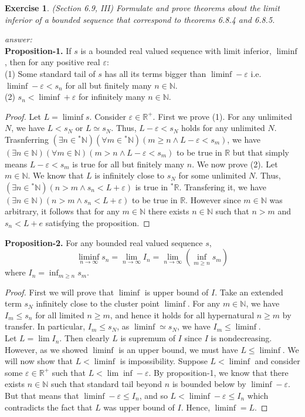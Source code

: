 \documentclass[a4paper, 11pt, openany]{book}
\theoremstyle{plain}
\newtheorem{exercise}{Exercise}[chapter]
\newenvironment{answer}
    {\textit{answer:}}
    {}
\theoremstyle{plain}
\newcommand{\arr}{\rightarrow}
\newcommand{\N}{\mathbb{N}}
\newcommand{\R}{\mathbb{R}}
\newcommand{\ep}{\varepsilon}
\newcommand{\hyp}{{}^*}
\begin{document}
  \begin{exercise}
    (Section 6.9, III)
    Formulate and prove theorems about the limit inferior of a bounded sequence that correspond to theorems 6.8.4 and 6.8.5.
  \end{exercise} 
  \begin{answer} $ $ \\
    \textbf{Proposition-1.} If $s$ is a bounded real valued sequence with limit inferior, $\liminf$, then for any positive real $\ep$: \\
    (1) Some standard tail of $s$ has all its terms bigger than $\liminf-\ep$ i.e. $\liminf-\ep<s_n$ for all but finitely many $n \in \N$. \\
    (2) $s_n<\liminf +\ep$ for infinitely many $n \in \N$.
    \begin{proof}
      Let $L=\liminf s$. Consider $\ep \in \R^+$. First we prove (1). For any unlimited $N$, we have $L<s_N$ or $L \simeq s_N$. Thus, $L-\ep<s_N$ holds for any unlimited $N$. Trasnferring $(\exists n \in \hyp \N)(\forall m \in \hyp \N)(m \geq n \land L-\ep<s_m)$, we have $(\exists n \in \N)(\forall m \in \N)(m>n \land L-\ep<s_m)$ to be true in $\R$ but that simply means $L-\ep<s_m$ is true for all but finitely many $n$. We now prove (2). Let $m \in \N$. We know that $L$ is infinitely close to $s_N$ for some unlimited $N$. Thus, $(\exists n \in \hyp \N)(n>m \land s_n<L+\ep)$ is true in $\hyp \R$. Transfering it, we have $(\exists n \in \N)(n>m \land s_n<L+\ep)$ to be true in $\R$. However since $m \in \N$ was arbitrary, it follows that for any $m \in \N$ there exists $n \in \N$ such that $n>m$ and $s_n<L+e$ satisfying the proposition.
    \end{proof}
    \textbf{Proposition-2.} For any bounded real valued sequence $s$, $$\liminf_{n \arr \infty} s_n=\lim_{n \arr \infty} I_n=\lim_{n \arr \infty} \left(\inf_{m \geq n} s_m \right)$$ where $I_n=\inf_{m \geq n} s_m$.
    \begin{proof}
      First we will prove that $\liminf$ is upper bound of $I$. Take an extended term $s_N$ infinitely close to the cluster point $\liminf$. For any $m \in \N$, we have $I_m \leq s_n$ for all limited $n \geq m$, and hence it holds for all hypernatural $n \geq m$ by transfer. In particular, $I_m \leq s_N$, as $\liminf \simeq s_N$, we have $I_m \leq \liminf$. \\
      Let $L=\lim I_n$. Then clearly $L$ is supremum of $I$ since $I$ is nondecreasing. However, as we showed $\liminf$ is an upper bound, we must have $L \leq \liminf$. We will now show that $L< \liminf$ is impossibility. Suppose $L< \liminf$ and consider some $\ep \in \R^+$ such that $L<\lim\inf-\ep$. By proposition-1, we know that there exists $n \in \N$ such that standard tail beyond $n$ is bounded below by $\liminf-\ep$. But that means that $\liminf-\ep \leq I_n$, and so $L<\liminf-\ep\leq I_n$ which contradicts the fact that $L$ was upper bound of $I$. Hence, $\liminf=L$.
    \end{proof}
  \end{answer}
\end{document}
